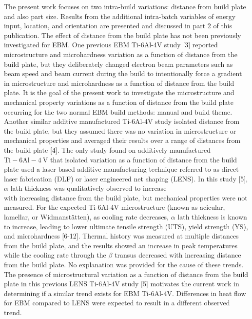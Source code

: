 \documentclass[10pt]{article}
\begin{document}
The present work focuses on two intra-build variations: distance from build plate and also part size. Results from the additional intra-batch variables of energy input, location, and orientation are presented and discussed in part 2 of this publication. The effect of distance from the build plate has not been previously investigated for EBM. One previous EBM Ti-6Al-4V study [3] reported microstructure and microhardness variation as a function of distance from the build plate, but they deliberately changed electron beam parameters such as beam speed and beam current during the build to intentionally force a gradient in microstructure and microhardness as a function of distance from the build plate. It is the goal of the present work to investigate the microstructure and mechanical property variations as a function of distance from the build plate occurring for the two normal EBM build methods: manual and build theme. Another similar additive manufactured Ti-6Al-4V study isolated distance from the build plate, but they assumed there was no variation in microstructure or mechanical properties and averaged their results over a range of distances from the build plate [4]. The only study found on additively manufactured $\mathrm{Ti}-6 \mathrm{Al}-4 \mathrm{~V}$ that isolated variation as a function of distance from the build plate used a laser-based additive manufacturing technique referred to as direct laser fabrication (DLF) or laser engineered net shaping (LENS). In this study [5], $\alpha$ lath thickness was qualitatively observed to increase\\
with increasing distance from the build plate, but mechanical properties were not measured. For the expected Ti-6Al-4V microstructure (known as acicular, lamellar, or Widmanstätten), as cooling rate decreases, $\alpha$ lath thickness is known to increase, leading to lower ultimate tensile strength (UTS), yield strength (YS), and microhardness [6-12]. Thermal history was measured at multiple distances from the build plate, and the results showed an increase in peak temperatures while the cooling rate through the $\beta$ transus decreased with increasing distance from the build plate. No explanation was provided for the cause of these trends. The presence of microstructural variation as a function of distance from the build plate in this previous LENS Ti-6Al-4V study [5] motivates the current work in determining if a similar trend exists for EBM Ti-6Al-4V. Differences in heat flow for EBM compared to LENS were expected to result in a different observed trend.
\end{document}
